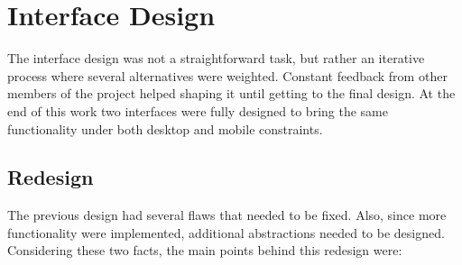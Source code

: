 \section{Interface Design} %
\label{sec:interface_design}

The interface design was not a straightforward task, but rather an iterative process where several alternatives were weighted.
Constant feedback from other members of the project helped shaping it until getting to the final design.
At the end of this work two interfaces were fully designed to bring the same functionality under both desktop and mobile constraints.

\subsection{Redesign} %
\label{sub:redesign}

The previous design had several flaws that needed to be fixed.
Also, since more functionality were implemented, additional abstractions needed to be designed.
Considering these two facts, the main points behind this redesign were:

